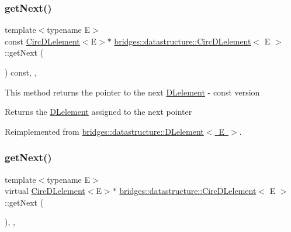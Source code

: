 \mbox{\label{classbridges_1_1datastructure_1_1_circ_d_lelement_a3b54f07ffa49151ed13d8b8df964a4ee}} 
\subsubsection{\texorpdfstring{getNext()}{getNext()}\hspace{0.1cm}{\footnotesize\ttfamily [1/2]}}
{\footnotesize\ttfamily template$<$typename E$>$ \\
const \mbox{\hyperlink{classbridges_1_1datastructure_1_1_circ_d_lelement}{Circ\+D\+Lelement}}$<$E$>$$\ast$ \mbox{\hyperlink{classbridges_1_1datastructure_1_1_circ_d_lelement}{bridges\+::datastructure\+::\+Circ\+D\+Lelement}}$<$ E $>$\+::get\+Next (\begin{DoxyParamCaption}{ }\end{DoxyParamCaption}) const\hspace{0.3cm}{\ttfamily [inline]}, {\ttfamily [override]}, {\ttfamily [virtual]}}

This method returns the pointer to the next \mbox{\hyperlink{classbridges_1_1datastructure_1_1_d_lelement}{D\+Lelement}} -\/ const version \begin{DoxyReturn}{Returns}
the \mbox{\hyperlink{classbridges_1_1datastructure_1_1_d_lelement}{D\+Lelement}} assigned to the next pointer 
\end{DoxyReturn}


Reimplemented from \mbox{\hyperlink{classbridges_1_1datastructure_1_1_d_lelement_a8599e5be5fc1771d4e8a40f6de67b4a7}{bridges\+::datastructure\+::\+D\+Lelement$<$ E $>$}}.

\mbox{\label{classbridges_1_1datastructure_1_1_circ_d_lelement_a80681d0382643a6df21da1bec4067004}} 
\subsubsection{\texorpdfstring{getNext()}{getNext()}\hspace{0.1cm}{\footnotesize\ttfamily [2/2]}}
{\footnotesize\ttfamily template$<$typename E$>$ \\
virtual \mbox{\hyperlink{classbridges_1_1datastructure_1_1_circ_d_lelement}{Circ\+D\+Lelement}}$<$E$>$$\ast$ \mbox{\hyperlink{classbridges_1_1datastructure_1_1_circ_d_lelement}{bridges\+::datastructure\+::\+Circ\+D\+Lelement}}$<$ E $>$\+::get\+Next (\begin{DoxyParamCaption}{ }\end{DoxyParamCaption})\hspace{0.3cm}{\ttfamily [inline]}, {\ttfamily [override]}, {\ttfamily [virtual]}}

